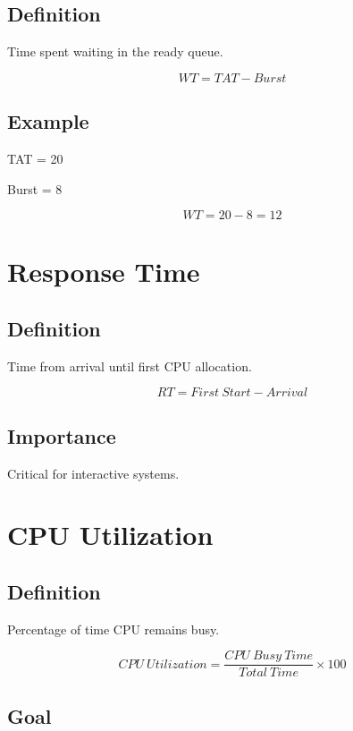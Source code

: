 \subsection{Definition}

Time spent waiting in the ready queue.

\[
WT=TAT-Burst
\]

\subsection{Example}

TAT = 20

Burst = 8

\[
WT=20-8=12
\]

\section{Response Time}

\subsection{Definition}

Time from arrival until first CPU allocation.

\[
RT = First\ Start - Arrival
\]

\subsection{Importance}

Critical for interactive systems.

\section{CPU Utilization}

\subsection{Definition}

Percentage of time CPU remains busy.

\[
CPU\ Utilization=
\frac{CPU\ Busy\ Time}
{Total\ Time}
\times100
\]

\subsection{Goal}

